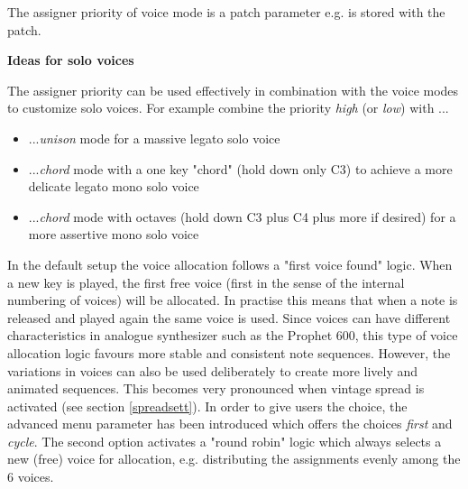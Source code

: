 The assigner priority of voice mode is a patch parameter e.g. is stored with the patch.

\textbf{Ideas for solo voices}

The assigner priority can be used effectively in combination with the voice modes to customize solo voices. For example combine the priority \textit{high} (or \textit{low}) with ...
\begin{itemize}
  \item ...\textit{unison} mode for a massive legato solo voice
  \item ...\textit{chord} mode with a one key "chord" (hold down only C3) to achieve a more delicate legato mono solo voice
  \item ...\textit{chord} mode with octaves (hold down C3 plus C4 plus more if desired) for a more assertive mono solo voice   
\end{itemize}

In the default setup the voice allocation follows a "first voice found" logic. When a new key is played, the first free voice (first in the sense of the internal numbering of voices) will be allocated. In practise this means that when a note is released and played again the same voice is used. Since voices can have different characteristics in analogue synthesizer such as the Prophet 600, this type of voice allocation logic favours more stable and consistent note sequences. However, the variations in voices can also be used deliberately to create more lively and animated sequences. This becomes very pronounced when vintage spread is activated (see section \ref{spreadsett}). In order to give users the choice, the advanced menu parameter \assign has been introduced which offers the choices \textit{first} and \textit{cycle}. The second option activates a "round robin" logic which always selects a new (free) voice for allocation, e.g. distributing the assignments evenly among the 6 voices.   
